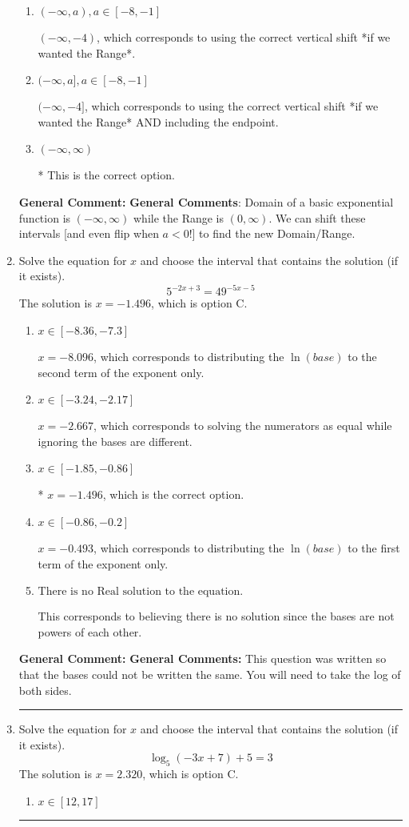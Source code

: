 \documentclass{extbook}[14pt]
\newcommand{\litem}[1]{\item #1

\rule{\textwidth}{0.4pt}}
\begin{document}
\begin{enumerate}
{\begin{enumerate}[label=\Alph*.]
$[4, \infty)$, which corresponds to using the negative vertical shift AND flipping the Range interval AND including the endpoint.
\item \( (-\infty, a), a \in [-8, -1] \)

$(-\infty, -4)$, which corresponds to using the correct vertical shift *if we wanted the Range*.
\item \( (-\infty, a], a \in [-8, -1] \)

$(-\infty, -4]$, which corresponds to using the correct vertical shift *if we wanted the Range* AND including the endpoint.
\item \( (-\infty, \infty) \)

* This is the correct option.
\end{enumerate}

\textbf{General Comment:} \textbf{General Comments}: Domain of a basic exponential function is $(-\infty, \infty)$ while the Range is $(0, \infty)$. We can shift these intervals [and even flip when $a<0$!] to find the new Domain/Range.
}
\litem{
Solve the equation for $x$ and choose the interval that contains the solution (if it exists).
\[ 5^{-2x+3} = 49^{-5x-5} \]The solution is \( x = -1.496 \), which is option C.\begin{enumerate}[label=\Alph*.]
\item \( x \in [-8.36, -7.3] \)

$x = -8.096$, which corresponds to distributing the $\ln(base)$ to the second term of the exponent only.
\item \( x \in [-3.24, -2.17] \)

$x = -2.667$, which corresponds to solving the numerators as equal while ignoring the bases are different.
\item \( x \in [-1.85, -0.86] \)

* $x = -1.496$, which is the correct option.
\item \( x \in [-0.86, -0.2] \)

$x = -0.493$, which corresponds to distributing the $\ln(base)$ to the first term of the exponent only.
\item \( \text{There is no Real solution to the equation.} \)

This corresponds to believing there is no solution since the bases are not powers of each other.
\end{enumerate}

\textbf{General Comment:} \textbf{General Comments:} This question was written so that the bases could not be written the same. You will need to take the log of both sides.
}
\litem{
Solve the equation for $x$ and choose the interval that contains the solution (if it exists).
\[ \log_{5}{(-3x+7)}+5 = 3 \]The solution is \( x = 2.320 \), which is option C.\begin{enumerate}[label=\Alph*.]
\item \( x \in [12, 17] \)


\end{enumerate}}
\end{enumerate}
\end{document}
